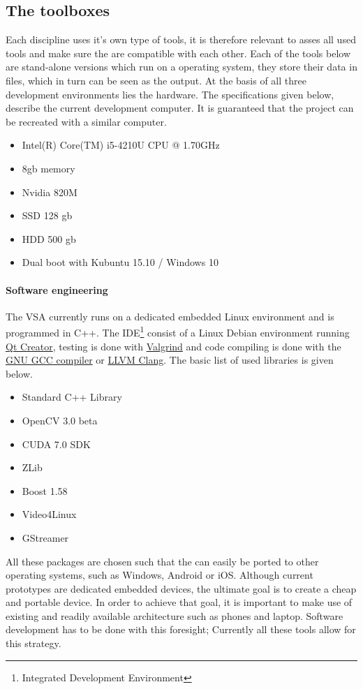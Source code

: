 \documentclass[fleqn,10pt]{SelfArx} %
\begin{document}
\subsection{The toolboxes}\label{sec:Toolboxes}
Each discipline uses it's own type of tools, it is therefore relevant to asses all used tools and make sure the are compatible with each other. Each of the tools below are stand-alone versions which run on a operating system, they store their data in files, which in turn can be seen as the output. At the basis of all three development environments lies the hardware. The specifications given below, describe the current development computer. It is guaranteed that the project can be recreated with a similar computer.
\begin{itemize}[noitemsep]
	\item Intel(R) Core(TM) i5-4210U CPU @ 1.70GHz
	\item 8gb memory
	\item Nvidia 820M
	\item SSD 128 gb
	\item HDD 500 gb
	\item Dual boot with Kubuntu 15.10 / Windows 10
\end{itemize}

\paragraph{Software engineering}
The VSA currently runs on a dedicated embedded Linux environment and is programmed in C++. The IDE\footnote{Integrated Development Environment} consist of a Linux Debian environment running \href{http://www.qt.io/}{\color{color1}Qt Creator}, testing is done with \href{http://valgrind.org/}{\color{color1}Valgrind} and code compiling is done with the \href{https://gcc.gnu.org/}{\color{color1}GNU GCC compiler} or \href{http://clang.llvm.org/}{\color{color1}LLVM Clang}.
The basic list of used libraries is given below.
\begin{itemize}[noitemsep]
	\item Standard C++ Library
	\item OpenCV 3.0 beta
	\item CUDA 7.0 SDK
	\item ZLib
	\item Boost 1.58
	\item Video4Linux
	\item GStreamer
\end{itemize}

All these packages are chosen such that the can easily be ported to other operating systems, such as Windows, Android or iOS. Although current prototypes are dedicated embedded devices, the ultimate goal is to create a cheap and portable device. In order to achieve that goal, it is important to make use of existing and readily available architecture such as phones and laptop. Software development has to be done with this foresight; Currently all these tools allow for this strategy.
\end{document}
